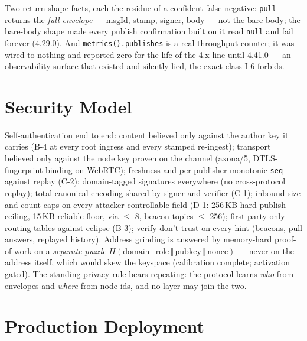 \documentclass[nobib]{tufte-handout}
\begin{document}
Two return-shape facts, each the residue of a confident-false-negative:
\texttt{pull} returns the \emph{full envelope} --- msgId, stamp, signer,
body --- not the bare body; the bare-body shape made every publish
confirmation built on it read \texttt{null} and fail forever (4.29.0).
And \texttt{metrics().publishes} is a real throughput counter; it was
wired to nothing and reported zero for the life of the 4.x line until
4.41.0 --- an observability surface that existed and silently lied,
the exact class I-6 forbids.

\section{Security Model}

Self-authentication end to end: content believed only against the
author key it carries (B-4 at every root ingress and every stamped
re-ingest); transport believed only against the node key proven on the
channel (axona/5, DTLS-fingerprint binding on WebRTC); freshness and
per-publisher monotonic \texttt{seq} against replay (C-2);
domain-tagged signatures everywhere (no cross-protocol replay); total
canonical encoding shared by signer and verifier (C-1); inbound size and
count caps on every attacker-controllable field (D-1: 256\,KB hard
publish ceiling, 15\,KB reliable floor, via $\le$ 8, beacon topics
$\le$ 256); first-party-only routing tables against eclipse (B-3);
verify-don't-trust on every hint (beacons, pull answers, replayed
history). Address grinding is answered by memory-hard proof-of-work on a
\emph{separate puzzle} $H(\mathrm{domain}\,\Vert\,\mathrm{role}\,\Vert\,
\mathrm{pubkey}\,\Vert\,\mathrm{nonce})$ --- never on the address itself,
which would skew the keyspace (calibration complete; activation gated).
The standing privacy rule bears repeating: the protocol learns
\emph{who} from envelopes and \emph{where} from node ids, and no layer
may join the two.

\section{Production Deployment}
\end{document}
